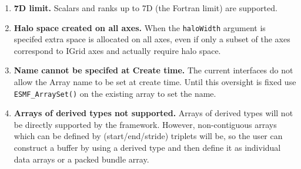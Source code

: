 

\begin{enumerate}

\item {\bf 7D limit.}  Scalars and ranks up to 7D (the Fortran limit) are 
supported.

\item {\bf Halo space created on all axes.}
When the {\tt haloWidth} argument is specifed extra space is allocated
on all axes, even if only a subset of the axes correspond to IGrid axes 
and actually require halo space.

\item {\bf Name cannot be specifed at Create time.}
The current interfaces do not allow the Array name to be set at
create time. Until this oversight is fixed use 
{\tt ESMF\_ArraySet()} on the existing array to set the name.

\item {\bf Arrays of derived types not supported.}  Arrays of derived 
types will not be directly supported by the framework.
However, non-contiguous arrays which can be defined by (start/end/stride)
triplets will be, so the user can construct a buffer by using a derived
type and then define it as individual data arrays or a packed bundle array.

\end{enumerate}
